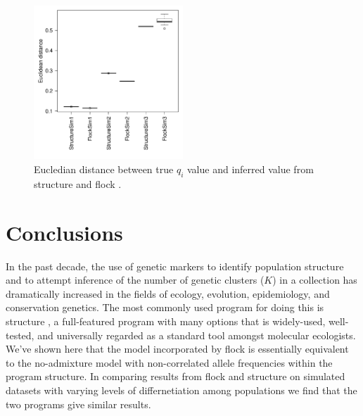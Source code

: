 \begin{figure}
\begin{center}
    \includegraphics[width=0.5\textwidth]{images/Figures-Pat/EucliDist.pdf}   %
    \caption{Eucledian distance between true $q_i$ value and inferred value from {\sc structure} and {\sc flock} .}
    \label{fig:ED}
\end{center}
\end{figure}

\section*{Conclusions}
In the past decade, the use of genetic markers to identify population structure and to attempt inference of
the number of genetic clusters ($K$) in a collection has dramatically increased in the fields of ecology, evolution, 
epidemiology, and conservation
genetics. The most commonly used program for doing this is {\sc structure} \citep{Pritchardetal2000,Falushetal2003}, 
a full-featured program with many options that is widely-used, well-tested, and universally regarded as a standard tool amongst molecular ecologists. 
We've shown here that the model incorporated by {\sc flock} is essentially equivalent to the no-admixture model with non-correlated allele frequencies within the program {\sc structure}. In comparing results from {\sc flock} and {\sc structure} 
on simulated datasets with varying levels of differnetiation among populations
we find that the two programs give similar results.

